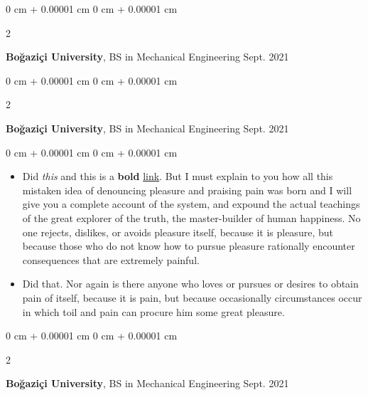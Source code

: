 \documentclass[10pt, letterpaper]{article}
\newenvironment{highlights}{
    \begin{itemize}[
        topsep=0.10 cm,
        parsep=0.10 cm,
        partopsep=0pt,
        itemsep=0pt,
        leftmargin=0 cm + 10pt
    ]
}{
    \end{itemize}
} %
\newenvironment{onecolentry}{
    \begin{adjustwidth}{
        0 cm + 0.00001 cm
    }{
        0 cm + 0.00001 cm
    }
}{
    \end{adjustwidth}
} %
\newenvironment{twocolentry}[2][]{
    \onecolentry
    \def\secondColumn{#2}
    \setcolumnwidth{\fill, 4.5 cm}
    \begin{paracol}{2}
}{
    \switchcolumn \raggedleft \secondColumn
    \end{paracol}
    \endonecolentry
} %
\begin{document}
        \begin{twocolentry}{
            Sept. 2021
        }
            \textbf{Boğaziçi University}, BS in Mechanical Engineering\end{twocolentry}



        \vspace{0.2 cm}

        \begin{twocolentry}{
            Sept. 2021
        }
            \textbf{Boğaziçi University}, BS in Mechanical Engineering\end{twocolentry}

        \vspace{0.10 cm}
        \begin{onecolentry}
            \begin{highlights}
                \item Did \textit{this} and this is a \textbf{bold} \href{https://example.com}{link}. But I must explain to you how all this mistaken idea of denouncing pleasure and praising pain was born and I will give you a complete account of the system, and expound the actual teachings of the great explorer of the truth, the master-builder of human happiness. No one rejects, dislikes, or avoids pleasure itself, because it is pleasure, but because those who do not know how to pursue pleasure rationally encounter consequences that are extremely painful.
                \item Did that. Nor again is there anyone who loves or pursues or desires to obtain pain of itself, because it is pain, but because occasionally circumstances occur in which toil and pain can procure him some great pleasure.
            \end{highlights}
        \end{onecolentry}


        \vspace{0.2 cm}

        \begin{twocolentry}{
            Sept. 2021
        }
            \textbf{Boğaziçi University}, BS in Mechanical Engineering\end{twocolentry}
\end{document}
